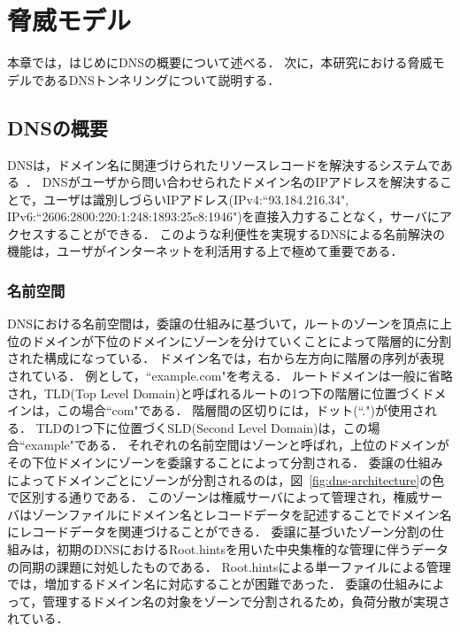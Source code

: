 \section{脅威モデル}
\label{sec:dns-tunneling}
本章では，はじめにDNSの概要について述べる．
次に，本研究における脅威モデルであるDNSトンネリングについて説明する．

\subsection{DNSの概要}
\label{sec:dns-protocol}

DNSは，ドメイン名に関連づけられたリソースレコードを解決するシステムである~\cite{rfc1034, rfc1035}．
DNSがユーザから問い合わせられたドメイン名のIPアドレスを解決することで，ユーザは識別しづらいIPアドレス(IPv4:``93.184.216.34", IPv6:``2606:2800:220:1:248:1893:25c8:1946")を直接入力することなく，サーバにアクセスすることができる．
このような利便性を実現するDNSによる名前解決の機能は，ユーザがインターネットを利活用する上で極めて重要である．

\subsubsection{名前空間}
DNSにおける名前空間は，委譲の仕組みに基づいて，ルートのゾーンを頂点に上位のドメインが下位のドメインにゾーンを分けていくことによって階層的に分割された構成になっている．
ドメイン名では，右から左方向に階層の序列が表現されている．
例として，``example.com"を考える．
ルートドメインは一般に省略され，TLD(Top Level Domain)と呼ばれるルートの1つ下の階層に位置づくドメインは，この場合``com"である．
階層間の区切りには，ドット(``.")が使用される．
TLDの1つ下に位置づくSLD(Second Level Domain)は，この場合``example"である．
それぞれの名前空間はゾーンと呼ばれ，上位のドメインがその下位ドメインにゾーンを委譲することによって分割される．
委譲の仕組みによってドメインごとにゾーンが分割されるのは，図~\ref{fig:dns-architecture}の色で区別する通りである．
このゾーンは権威サーバによって管理され，権威サーバはゾーンファイルにドメイン名とレコードデータを記述することでドメイン名にレコードデータを関連づけることができる．
委譲に基づいたゾーン分割の仕組みは，初期のDNSにおけるRoot.hintsを用いた中央集権的な管理に伴うデータの同期の課題に対処したものである．
Root.hintsによる単一ファイルによる管理では，増加するドメイン名に対応することが困難であった．
委譲の仕組みによって，管理するドメイン名の対象をゾーンで分割されるため，負荷分散が実現されている．

